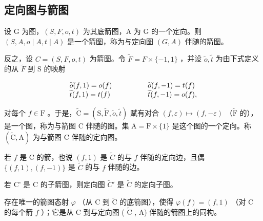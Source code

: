 \subsection{定向图与箭图}

设 G 为图，\((S,F,o,t)\) 为其底箭图，A 为 G 的一个定向。则 \((S,A,o\mid A,t\mid A)\) 是一个箭图，称为与定向图 \((G,A)\) 伴随的箭图。

反之，设 \(C = (S, F, o, t)\) 为箭图。令 \(\widetilde{F} = F \times \{-1, 1\}\) ，并设 \(\widetilde{o}, \widetilde{t}\) 为由下式定义的从 \(\widetilde{F}\) 到 S 的映射

\[
\begin{array}{l l} \widetilde {o} (f, 1) = o (f) & \qquad \qquad \widetilde {o} (f, - 1) = t (f) \\ \widetilde {t} (f, 1) = t (f) & \qquad \qquad \widetilde {t} (f, - 1) = o (f), \end{array}
\]

对每个 \(f \in \mathrm{F}\) 。于是，\(\widetilde{\mathrm{C}} = (\mathrm{S}, \widetilde{\mathrm{F}}, \widetilde{o}, \widetilde{t})\) 赋有对合 \((f, \varepsilon) \mapsto (f, -\varepsilon)\) （\(\widetilde{\mathrm{F}}\) 的），是一个图，称为与箭图 C 伴随的图。集 \(\mathrm{A} = \mathrm{F} \times \{1\}\) 是这个图的一个定向。称 \((\widetilde{\mathrm{C}}, \mathrm{A})\) 为与箭图 C 伴随的定向图。

若 \(f\) 是 C 的箭，也说 \((f,1)\) 是 \(\widetilde{C}\) 的与 \(f\) 伴随的定向边，且偶 \(\{(f,1),(f,-1)\}\) 是 \(\widetilde{C}\) 的与 \(f\) 伴随的边。

若 C' 是 C 的子箭图，则定向图 \(\widetilde{C}'\) 是 \(\widetilde{C}\) 的定向子图。

存在唯一的箭图态射 \(\varphi\) （从 C 到 \(\widetilde{\mathrm{C}}\) 的底箭图），使得 \(\varphi(f) = (f,1)\) （对 C 的每个箭 \(f\) ）；它是从 C 到与定向图 ( \(\widetilde{\mathrm{C}}\) , A) 伴随的箭图上的同构。

